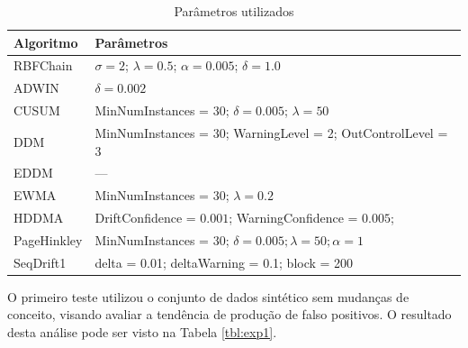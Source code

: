 \documentclass[msc, classic, a4paper]{ufbathesis}
\begin{document}
\begin{table}[H]
\centering
\caption{Parâmetros utilizados}
\label{tbl:parametros_algoritmos}
\begin{tabularx}{\textwidth}{lX}
\toprule
Algoritmo & Parâmetros \\
\midrule
RBFChain                  &  $\sigma = 2$; $\lambda = 0.5$; $\alpha = 0.005$; $\delta = 1.0$ \\
ADWIN                     &  $\delta = 0.002$ \\
CUSUM                     &  MinNumInstances = 30; $\delta = 0.005$; $\lambda = 50$ \\
DDM & MinNumInstances = 30; WarningLevel = 2; OutControlLevel = 3 \\
EDDM & --- \\
EWMA &  MinNumInstances = 30; $\lambda = 0.2$ \\
HDDMA & DriftConfidence = $0.001$; WarningConfidence = $0.005$; \\
PageHinkley &  MinNumInstances = 30; $\delta = 0.005; \lambda = 50; \alpha = 1$ \\
SeqDrift1 & delta = 0.01; deltaWarning = 0.1; block = 200 \\
\bottomrule
\end{tabularx}
\end{table}

O primeiro teste utilizou o conjunto de dados sintético sem mudanças de conceito, visando avaliar a tendência de produção de falso positivos.
O resultado desta análise pode ser visto na Tabela \ref{tbl:exp1}.
\end{document}
